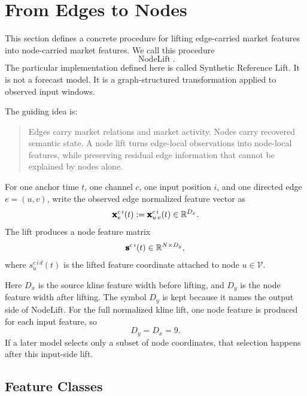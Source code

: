 \newpage{}
\section{From Edges to Nodes}
\label{sec:edges-to-nodes}

This section defines a concrete procedure for lifting edge-carried market
features into node-carried market features.  We call this procedure
\[
  \operatorname{NodeLift}.
\]
The particular implementation defined here is called Synthetic Reference
Lift.
It is not a forecast model.  It is a graph-structured transformation applied
to observed input windows.

The guiding idea is:

\begin{quote}
Edges carry market relations and market activity.  Nodes carry recovered
semantic state.  A node lift turns edge-local observations into node-local
features, while preserving residual edge information that cannot be explained by
nodes alone.
\end{quote}

For one anchor time $t$, one channel $c$, one input position $i$, and one
directed edge $e=(u,v)$, write the observed edge normalized feature vector as
\[
  \pmb{\mathbf{x}}_{e}^{c\,i}(t)
  :=
  \pmb{\mathbf{x}}_{u\,v}^{c\,i}(t)
  \in
  \mathbb{R}^{D_x}.
\]
The lift produces a node feature matrix
\[
  \pmb{\mathbf{s}}^{c\,i}(t)
  \in
  \mathbb{R}^{N\times D_y},
\]
where $s_u^{c\,i\,d}(t)$ is the lifted feature coordinate attached to node
$u\in\mathcal{V}$.

Here $D_x$ is the source kline feature width before lifting, and $D_y$ is the
node feature width after lifting.  The symbol $D_y$ is kept because it names the
output side of NodeLift.  For the full normalized kline lift, one node feature
is produced for each input feature, so
\[
  D_y=D_x=9.
\]
If a later model selects only a subset of node coordinates, that selection
happens after this input-side lift.


\subsection{Feature Classes}
\label{subsec:node-lift-feature-classes}

